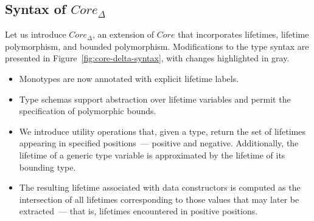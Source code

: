 \documentclass[acmsmall]{acmart}
\begin{document}
\subsection{Syntax of $Core_\Delta$}

Let us introduce $Core_\Delta$, an extension of $Core$ that incorporates lifetimes, lifetime polymorphism, and bounded polymorphism.
Modifications to the type syntax are presented in Figure~\ref{fig:core-delta-syntax}, with changes highlighted in gray.
\begin{itemize}
    \item Monotypes are now annotated with explicit lifetime labels.
    \item Type schemas support abstraction over lifetime variables and permit the specification of polymorphic bounds.
    \item We introduce utility operations that, given a type, return the set of lifetimes appearing in specified positions~--- positive and negative. %
    Additionally, the lifetime of a generic type variable is approximated by the lifetime of its bounding type.
    \item The resulting lifetime associated with data constructors is computed as the intersection of all lifetimes corresponding to those values that may later be extracted~--- that is, lifetimes encountered in positive positions.
\end{itemize}
\end{document}
